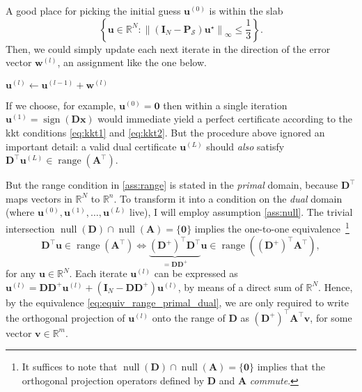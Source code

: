 A good place for picking the initial guess $\mathbf{u}^{(0)}$ is within the slab
\begin{equation*}
    \left\{\mathbf{u} \in \mathbb{R}^{N} : \left \| \left ( \mathbf{I}_N - \mathbf{P}_\mathcal{S} \right ) \mathbf{u}^\star \right \|_{\infty} \leq \frac{1}{3} \right\}.
\end{equation*}
Then, we could simply update each next iterate in the direction of the error vector $\mathbf{w}^{(l)}$, an assignment like the one below.
\begin{algorithm}[H]
    \begin{algorithmic}[1]
        \State{$\ldots$}
        \State $\mathbf{u}^{(l)} \gets \mathbf{u}^{(l- 1)} + \mathbf{w}^{(l)}$
        \State{$\ldots$}
    \end{algorithmic}
\end{algorithm}

If we choose, for example, $\mathbf{u}^{(0)} = \mathbf{0}$ then within a single iteration $\mathbf{u}^{(1)} = \operatorname{sign} \left ( \mathbf{Dx} \right)$ would immediate yield a perfect certificate according to the \acrshort{kkt} conditions \eqref{eq:kkt1} and \eqref{eq:kkt2}. But the procedure above ignored an important detail: a valid dual certificate $\mathbf{u}^{(L)}$ should \emph{also} satisfy $\mathbf{D}^{\top}\mathbf{u}^{(L)} \in \operatorname{range} \left ( \mathbf{A^{\top}} \right )$.

But the range condition in \eqref{ass:range} is stated in the \emph{primal} domain, because $\mathbf{D}^\top$ maps vectors in $\mathbb{R}^{N}$ to $\mathbb{R}^{n}$. To transform it into a condition on the \emph{dual} domain (where $\mathbf{u}^{(0)}, \mathbf{u}^{(1)}, \dots, \mathbf{u}^{(L)}$ live), I will employ assumption \eqref{ass:null}. The trivial intersection $\operatorname{null} \left ( \mathbf{D} \right ) \cap \operatorname{null} \left ( \mathbf{A} \right ) = \{ \mathbf{0} \}$ implies the one-to-one equivalence~\footnote{It suffices to note that $\operatorname{null} \left ( \mathbf{D} \right ) \cap \operatorname{null} \left ( \mathbf{A} \right ) = \{ \mathbf{0} \}$ implies that the orthogonal projection operators defined by $\mathbf{D}$ and $\mathbf{A}$ \emph{commute}.}
\begin{equation}
    \mathbf{D}^{\top}\mathbf{u} \in \operatorname{range} \left ( \mathbf{A^{\top}} \right ) \iff \underbrace{(\mathbf{D}^{+})^{\top}\mathbf{D}^{\top}}_{= \mathbf{D} \mathbf{D}^{+}}\mathbf{u} \in \operatorname{range} \left ( (\mathbf{D}^{+})^{\top}\mathbf{A^{\top}} \right ),
    \label{eq:equiv_range_primal_dual}
\end{equation}
for any $\mathbf{u} \in \mathbb{R}^{N}$. Each iterate $\mathbf{u}^{(l)}$ can be expressed as $\mathbf{u}^{(l)} = \mathbf{D} \mathbf{D}^{+} \mathbf{u}^{(l)} + \left ( \mathbf{I}_N - \mathbf{D} \mathbf{D}^{+}\right )\mathbf{u}^{(l)}$, by means of a direct sum of $\mathbb{R}^{N}$. Hence, by the equivalence \eqref{eq:equiv_range_primal_dual}, we are only required to write the orthogonal projection of $\mathbf{u}^{(l)}$ onto the range of $\mathbf{D}$ as $(\mathbf{D}^{+})^{\top}\mathbf{A^{\top}} \mathbf{v}$, for some vector $\mathbf{v} \in \mathbb{R}^{m}$.

